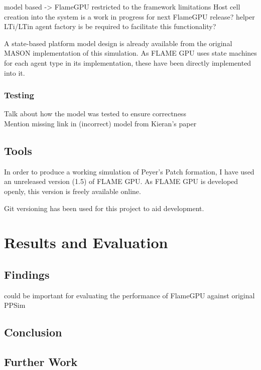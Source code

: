 \documentclass{UoYCSproject}
\begin{document}
model based -> FlameGPU\cite{flame_keratinocyte}
	restricted to the framework limitations
		Host cell creation into the system is a work in progress for next FlameGPU release?
			helper LTi/LTin agent factory is be required to facilitate this functionality?


	A state-based platform model design is already available from the original MASON implementation of this simulation.
	As FLAME GPU uses state machines for each agent type in its implementation, these have been directly implemented into it.

\subsection{Testing}
Talk about how the model was tested to ensure correctness\\
Mention missing link in (incorrect) model from Kieran's paper 

\section{Tools}
In order to produce a working simulation of Peyer's Patch formation, I have used an unreleased version (1.5) of FLAME GPU.
As FLAME GPU is developed openly, this version is freely available online\cite{flame_github}.

Git versioning has been used for this project to aid development.

\chapter{Results and Evaluation}
\section{Findings}
\cite{statistical_tests} could be important for evaluating the performance of FlameGPU against original PPSim

\section{Conclusion}

\section{Further Work}
\end{document}
